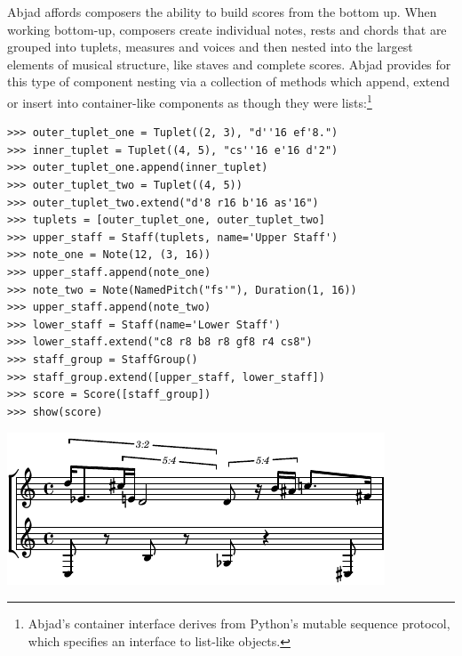 \documentclass{article}
\begin{document}
Abjad affords composers the ability to build scores from the bottom up.
When working bottom-up, composers create individual notes, rests and chords that
are grouped into tuplets, measures and voices and then nested into the
largest elements of musical structure, like staves and complete scores.
Abjad provides for this type of component nesting via a collection of methods which
append, extend or insert into container-like components as though they were lists:\footnote{Abjad's
container interface derives from Python's mutable sequence protocol, which specifies an interface to list-like objects.}

\begin{lstlisting}
>>> outer_tuplet_one = Tuplet((2, 3), "d''16 ef'8.")
>>> inner_tuplet = Tuplet((4, 5), "cs''16 e'16 d'2")
>>> outer_tuplet_one.append(inner_tuplet)
>>> outer_tuplet_two = Tuplet((4, 5))
>>> outer_tuplet_two.extend("d'8 r16 b'16 as'16")
>>> tuplets = [outer_tuplet_one, outer_tuplet_two]
>>> upper_staff = Staff(tuplets, name='Upper Staff')
>>> note_one = Note(12, (3, 16))
>>> upper_staff.append(note_one)
>>> note_two = Note(NamedPitch("fs'"), Duration(1, 16))
>>> upper_staff.append(note_two)
>>> lower_staff = Staff(name='Lower Staff')
>>> lower_staff.extend("c8 r8 b8 r8 gf8 r4 cs8")
>>> staff_group = StaffGroup()
>>> staff_group.extend([upper_staff, lower_staff])
>>> score = Score([staff_group])
>>> show(score)
\end{lstlisting}
\includegraphics{assets/lilypond-3267998ba22aaacb9386665d12f8cce0.pdf}
\end{document}
